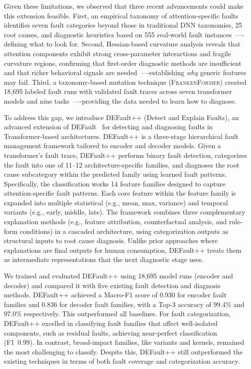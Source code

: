 Given these limitations, we observed that three recent advancements could make this extension feasible. First, an empirical taxonomy of attention-specific faults identifies seven fault categories beyond those in traditional DNN taxonomies, 25 root causes, and diagnostic heuristics based on 555 real-world fault instances~\cite{attention_taxonomy}—-defining what to look for. Second, Hessian-based curvature analysis reveals that attention components exhibit strong cross-parameter interactions and fragile curvature regions, confirming that first-order diagnostic methods are insufficient and that richer behavioral signals are needed~\cite{hessian_analysis}—-establishing \emph{why} generic features may fail. Third, a taxonomy-based mutation technique (\textsc{FrankenFormer}) created 18,695 labeled fault runs with validated fault traces across seven transformer models and nine tasks~\cite{frankenformer}—-providing the data needed to learn how to diagnose.

To address this gap, we introduce DEFault++ (Detect and Explain Faults), an advanced extension of DEFault~\cite{default} for detecting and diagnosing faults in Transformer-based architectures. DEFault++ is a three-stage hierarchical fault management framework tailored to encoder and decoder models. Given a transformer's fault trace, DEFault++ performs binary fault detection, categorizes the fault into one of 11--12 architecture-specific families, and diagnoses the root cause subcategory within the predicted family using learned fault patterns. Specifically, the classification works 14 feature families designed to capture attention-specific fault patterns. Each core feature within the feature family is expanded into multiple statistical (e.g., mean, max, variance) and temporal variants (e.g., early, middle, late). The framework combines three complementary explanation methods (e.g., feature attribution, counterfactual analysis, and rule-form conditions) in a cascaded architecture, using categorization outputs as structural inputs to root cause diagnosis. Unlike prior approaches where explanations are final outputs for human consumption, DEFault++ treats them as intermediate representations that the next diagnostic stage uses.

We trained and evaluated DEFault++ using 18,695 model runs (encoder and decoder) and compared it with five existing fault detection and diagnosis methods. DEFault++ achieved a Macro-F1 score of 0.930 for encoder fault families and 0.836 for decoder fault families, with a Top-3 accuracy of 99.4\% and 97.0\% respectively. This outperformed all baselines. For fault categorization, DEFault++ excelled in classifying fault families that affect well-isolated components, such as residual faults, achieving near-perfect classification (F1~0.99). In contrast, broad-impact families, like variants and kernels, remained the most challenging to classify. Despite this, DEFault++ still outperformed the existing techniques in terms of both fault coverage and categorization accuracy.

